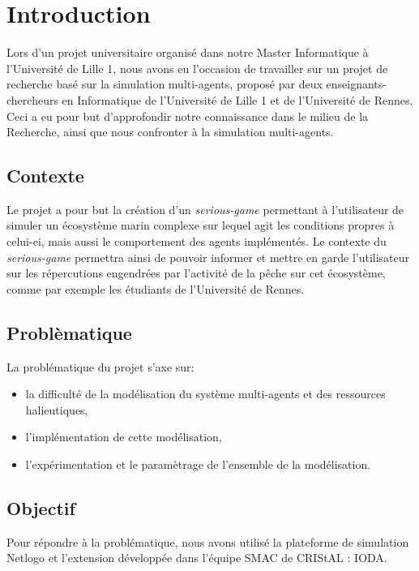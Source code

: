 \chapter*{Introduction}


Lors d'un projet universitaire organisé dans notre Master Informatique à l'Université de Lille 1, nous avons eu l'occasion de travailler sur un projet de recherche basé sur la simulation multi-agents, proposé par deux enseignants-chercheurs en Informatique de l'Université de Lille 1 et de l'Université de Rennes.
\\
Ceci a eu pour but d'approfondir notre connaissance dans le milieu de la Recherche, ainsi que nous confronter à la simulation multi-agents.

\section*{Contexte}

Le projet a pour but la création d'un \textit{serious-game} permettant à l'utilisateur de simuler un écosystème marin complexe sur lequel agit les conditions propres à celui-ci, mais aussi le comportement des agents implémentés. Le contexte du \textit{serious-game} permettra ainsi de pouvoir informer et mettre en garde l'utilisateur sur les répercutions engendrées par l'activité de la pêche sur cet écosystème, comme par exemple les étudiants de l'Université de Rennes.

\section*{Problèmatique}

La problématique du projet s'axe sur:
\begin{itemize}
\item{la difficulté de la modélisation du système multi-agents et des ressources halieutiques,}
\item{l'implémentation de cette modélisation,}
\item{l'expérimentation et le paramètrage de l'ensemble de la modélisation.}
\end{itemize}

\section*{Objectif}

Pour répondre à la problématique, nous avons utilisé la plateforme de simulation Netlogo et l'extension développée dans l'équipe SMAC de CRIStAL : IODA.
